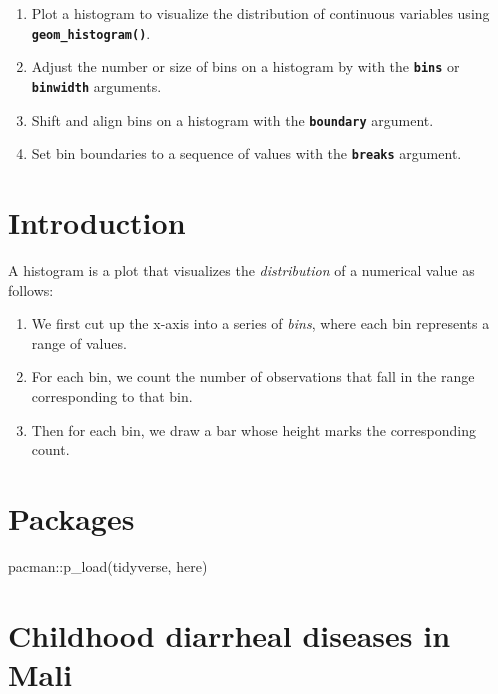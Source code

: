 \documentclass[
  letterpaper,
  DIV=11,
  numbers=noendperiod]{scrreprt}
\newenvironment{Shaded}{\begin{snugshade}}{\end{snugshade}}
\newcommand{\FunctionTok}[1]{\textcolor[rgb]{0.28,0.35,0.67}{#1}}
\newcommand{\NormalTok}[1]{\textcolor[rgb]{0.00,0.23,0.31}{#1}}
\newcommand{\SpecialCharTok}[1]{\textcolor[rgb]{0.37,0.37,0.37}{#1}}
\providecommand{\tightlist}{%
  \setlength{\itemsep}{0pt}\setlength{\parskip}{0pt}}\usepackage{longtable,booktabs,array}
\begin{document}
\begin{enumerate}
\def\labelenumi{\arabic{enumi}.}
\tightlist
\item
  Plot a histogram to visualize the distribution of continuous variables
  using \textbf{\texttt{geom\_histogram()}}.
\item
  Adjust the number or size of bins on a histogram by with the
  \textbf{\texttt{bins}} or \textbf{\texttt{binwidth}} arguments.
\item
  Shift and align bins on a histogram with the
  \textbf{\texttt{boundary}} argument.
\item
  Set bin boundaries to a sequence of values with the
  \textbf{\texttt{breaks}} argument.
\end{enumerate}

\hypertarget{introduction-16}{%
\section{Introduction}\label{introduction-16}}

A histogram is a plot that visualizes the \emph{distribution} of a
numerical value as follows:

\begin{enumerate}
\def\labelenumi{\arabic{enumi}.}
\item
  We first cut up the x-axis into a series of \emph{bins}, where each
  bin represents a range of values.
\item
  For each bin, we count the number of observations that fall in the
  range corresponding to that bin.
\item
  Then for each bin, we draw a bar whose height marks the corresponding
  count.
\end{enumerate}

\hypertarget{packages-11}{%
\section{Packages}\label{packages-11}}

\begin{Shaded}
\begin{Highlighting}[]
\NormalTok{pacman}\SpecialCharTok{::}\FunctionTok{p\_load}\NormalTok{(tidyverse,}
\NormalTok{               here)}
\end{Highlighting}
\end{Shaded}

\hypertarget{childhood-diarrheal-diseases-in-mali-1}{%
\section{Childhood diarrheal diseases in
Mali}\label{childhood-diarrheal-diseases-in-mali-1}}
\end{document}
